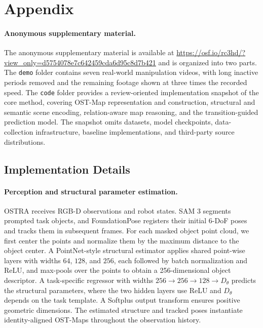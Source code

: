 \section{Appendix}
\label{app}

\paragraph{Anonymous supplementary material.}
The anonymous supplementary material is available at
\url{https://osf.io/rc3hd/?view_only=d5754078e7c642459cda6d95c8d7b421}
and is organized into two parts. The \texttt{demo} folder contains seven
real-world manipulation videos, with long inactive periods removed and the
remaining footage shown at three times the recorded speed. The
\texttt{code} folder provides a review-oriented implementation snapshot of
the core method, covering OST-Map representation and construction, structural
and semantic scene encoding, relation-aware map reasoning, and the
transition-guided prediction model. The snapshot omits datasets, model
checkpoints, data-collection infrastructure, baseline implementations, and
third-party source distributions.

\subsection{Implementation Details}
\label{app:implementation_details}

\paragraph{Perception and structural parameter estimation.}
OSTRA receives RGB-D observations and robot states. SAM 3 segments prompted
task objects, and FoundationPose registers their initial 6-DoF poses and
tracks them in subsequent frames. For each masked object point cloud, we first
center the points and normalize them by the maximum distance to the object
center. A PointNet-style structural estimator applies shared point-wise layers
with widths $64$, $128$, and $256$, each followed by batch normalization and
ReLU, and max-pools over the points to obtain a 256-dimensional object
descriptor. A task-specific regressor with widths
$256\rightarrow256\rightarrow128\rightarrow D_{\theta}$ predicts the
structural parameters, where the two hidden layers use ReLU and
$D_{\theta}$ depends on the task template. A Softplus output transform ensures
positive geometric dimensions. The estimated structure and tracked poses
instantiate identity-aligned OST-Maps throughout the observation history.

